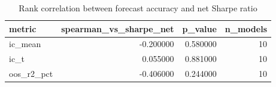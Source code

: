 \begin{table}
\caption{Rank correlation between forecast accuracy and net Sharpe ratio}
\label{tab:t1b_accuracy_vs_value}
\begin{tabular}{lrrr}
\toprule
metric & spearman\_vs\_sharpe\_net & p\_value & n\_models \\
\midrule
ic\_mean & -0.200000 & 0.580000 & 10 \\
ic\_t & 0.055000 & 0.881000 & 10 \\
oos\_r2\_pct & -0.406000 & 0.244000 & 10 \\
\bottomrule
\end{tabular}
\end{table}
